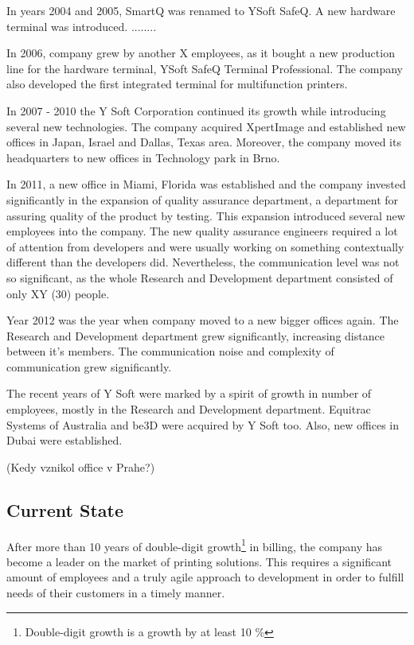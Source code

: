 \documentclass[11pt,singleside]{myfithesis2}
\begin{document}
In years 2004 and 2005, SmartQ was renamed to YSoft SafeQ. A new hardware terminal was introduced. ........

In 2006, company grew by another X employees, as it bought a new production line for the hardware terminal, YSoft SafeQ Terminal Professional. The company also developed the first integrated terminal for multifunction printers.

In 2007 - 2010 the Y Soft Corporation continued its growth while introducing several new technologies. The company acquired XpertImage and established new offices in Japan, Israel and Dallas, Texas area. Moreover, the company moved its headquarters to new offices in Technology park in Brno.

In 2011, a new office in Miami, Florida was established and the company invested significantly in the expansion of quality assurance department, a department for assuring quality of the product by testing. This expansion introduced several new employees into the company. The new quality assurance engineers required a lot of attention from developers and were usually working on something contextually different than the developers did. Nevertheless, the communication level was not so significant, as the whole Research and Development department consisted of only XY (30) people.

Year 2012 was the year when company moved to a new bigger offices again. The Research and Development department grew significantly, increasing distance between it's members. The communication noise and complexity of communication grew significantly.

The recent years of Y Soft were marked by a spirit of growth in number of employees, mostly in the Research and Development department. Equitrac Systems of Australia and be3D were acquired by Y Soft too. Also, new offices in Dubai were established.

(Kedy vznikol office v Prahe?)

		\subsection{Current State}
After more than 10 years of double-digit growth\footnote{Double-digit growth is a growth by at least 10 \%} in billing, the company has become a leader on the market of printing solutions. This requires a significant amount of employees and a truly agile approach to development in order to fulfill needs of their customers in a timely manner. 
\end{document}
